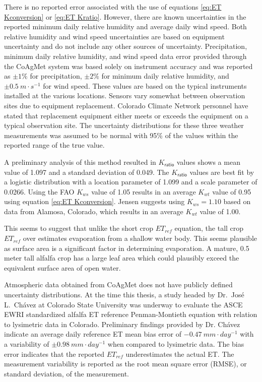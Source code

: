 There is no reported error associated with the use of equations \ref{eq:ET Kconversion} or \ref{eq:ET Kratio}.  However, there are known uncertainties in the reported minimum daily relative humidity and average daily wind speed.  Both relative humidity and wind speed uncertainties are based on equipment uncertainty and do not include any other sources of uncertainty.  Precipitation, minimum daily relative humidity, and wind speed data error provided through the CoAgMet system was based solely on instrument accuracy and was reported as $\pm1\%$ for precipitation, $\pm2\%$ for minimum daily relative humidity, and $\pm0.5~m \cdot s^{-1}$ for wind speed.  These values are based on the typical instruments installed at the various locations.  Sensors vary somewhat between observation sites due to equipment replacement.  Colorado Climate Network personnel have stated that replacement equipment either meets or exceeds the equipment on a typical observation site.  The uncertainty distributions for these three weather measurements was assumed to be normal with 95\% of the values within the reported range of the true value.

A preliminary analysis of this method resulted in $K_\mathsf{ratio}$ values shows a mean value of 1.097 and a standard deviation of 0.049.  The $K_\mathsf{ratio}$ values are best fit by a logistic distribution with a location parameter of 1.099 and a scale parameter of 0.0266.  Using the FAO $K_{ws}$ value of 1.05 results in an average $K_{wt}$ value of 0.95 using equation \ref{eq:ET Kconversion}.  Jensen suggests using $K_{ws}=1.10$ based on data from Alamosa, Colorado, which results in an average $K_{wt}$ value of 1.00.

This seems to suggest that unlike the short crop $ET_{ref}$ equation, the tall crop $ET_{ref}$ over estimates evaporation from a shallow water body.  This seems plausible as surface area is a significant factor in determining evaporation.  A mature, 0.5 meter tall alfalfa crop has a large leaf area which could plausibly exceed the equivalent surface area of open water.  

Atmospheric data obtained from CoAgMet does not have publicly defined uncertainty distributions.  At the time this thesis, a study headed by Dr.\ Jos\'{e} L.\ Ch\'{a}vez at Colorado State University was underway to evaluate the ASCE EWRI standardized alfalfa ET reference Penman-Montieth equation with relation to lysimetric data in Colorado.  Preliminary findings provided by Dr. Ch\'{a}vez indicate an average daily reference ET mean bias error of $-0.47~mm \cdot day^{-1}$ with a variability of $\pm 0.98~mm \cdot day^{-1}$ when compared to lysimetric data.  The bias error indicates that the reported $ET_{ref}$ underestimates the actual ET.  The measurement variability is reported as the root mean square error (RMSE), or standard deviation, of the measurement.

